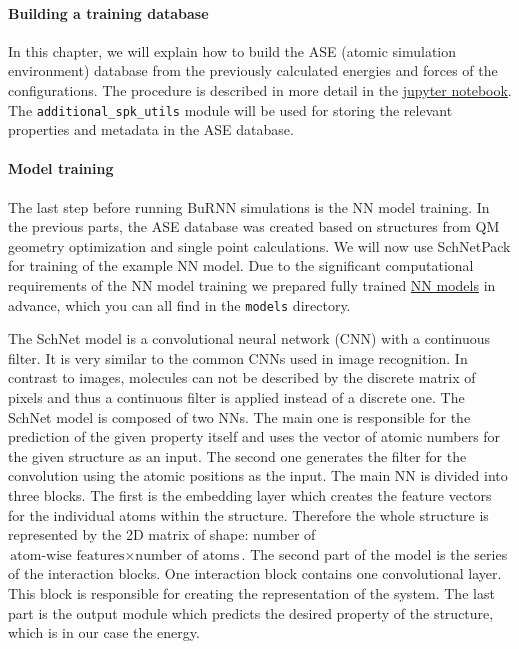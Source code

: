 \paragraph{Building a training database}
In this chapter, we will explain how to build the ASE (atomic simulation environment) \cite{Larsen2017ASE} database from the previously calculated energies and forces of the configurations. The procedure is described in more detail in the \href{https://github.com/LierB/gromos_tutorial_livecoms/blob/burnn_tutorial_rc/tutorial_files/t_06/train_dataset_tutorial/tutorial_v2.ipynb}{jupyter notebook}. The \texttt{additional\_spk\_utils} module will be used for storing the relevant properties and metadata in the ASE database. 


\paragraph{Model training}
The last step before running BuRNN simulations is the NN model training. In the previous parts, the ASE database was created based on structures from QM geometry optimization and single point calculations. We will now use SchNetPack for training of the example NN model. Due to the significant computational requirements of the NN model training we prepared fully trained \href{https://github.com/LierB/gromos_tutorial_livecoms/tree/burnn_tutorial_rc/tutorial_files/t_06/models}{NN models} in advance, which you can all find in the \texttt{models} directory. 


The SchNet model \cite{Schuett2018SchNet} is a convolutional neural network (CNN) with a continuous filter. It is very similar to the common CNNs used in image recognition. In contrast to images, molecules can not be described by the discrete matrix of pixels and thus a continuous filter is applied instead of a discrete one. The SchNet model is composed of two NNs. The main one is responsible for the prediction of the given property itself and uses the vector of atomic numbers for the given structure as an input. The second one generates the filter for the convolution using the atomic positions as the input. The main NN is divided into three blocks. The first is the embedding layer which creates the feature vectors for the individual atoms within the structure. Therefore the whole structure is represented by the 2D matrix of shape: number of $\text{atom-wise features}\times \text{number of atoms}$. The second part of the model is the series of the interaction blocks. One interaction block contains one convolutional layer. This block is responsible for creating the representation of the system. The last part is the output module which predicts the desired property of the structure, which is in our case the energy.

